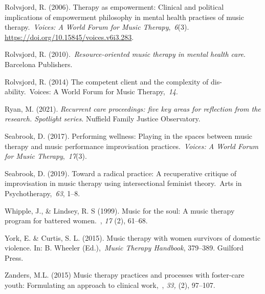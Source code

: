 \documentclass[authordate, empirical]{jote-new-article}
\begin{document}
Rolvsjord, R. (2006). Therapy as empowerment: Clinical and political implications of empowerment philosophy in mental health practises of music therapy. \emph{Voices: A World Forum for Music Therapy}, \emph{6}(3). \href{https://doi.org/10.15845/voices.v6i3.283}{https://doi.org/10.15845/voices.v6i3.283}.







Rolvsjord, R. (2010). \emph{Resource-oriented music therapy in mental health care}. Barcelona Publishers.







Rolvsjord, R. (2014) The competent client and the complexity of dis-ability. Voices: A World Forum for Music Therapy, \emph{14}.







Ryan, M. (2021). \emph{Recurrent care proceedings: five key areas for reflection from the research. Spotlight series.} Nuffield Family Justice Observatory.







Seabrook, D. (2017). Performing wellness: Playing in the spaces between music therapy and music performance improvisation practices. \emph{Voices: A World Forum for Music Therapy}, \emph{17}(3).







Seabrook, D. (2019). Toward a radical practice: A recuperative critique of improvisation in music therapy using intersectional feminist theory. Arts in Psychotherapy, \emph{63}, 1--8.







Whipple, J., \& Lindsey, R. S (1999). Music for the soul: A music therapy program for battered women. , \emph{17} (2), 61--68.







York, E. \& Curtis, S. L. (2015). Music therapy with women survivors of domestic violence. In: B. Wheeler (Ed.), \emph{Music Therapy Handbook}, 379--389. Guilford Press.







Zanders, M.L. (2015) Music therapy practices and processes with foster-care youth: Formulating an approach to clinical work, , \emph{33,} (2), 97--107.
\end{document}
